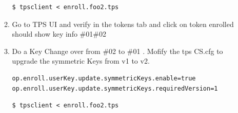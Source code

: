 \documentclass[12pt]{report}
\begin{document}
\begin{enumerate}[label*=\arabic*.]
\begin{enumerate}[label*=\arabic*.]
\begin{lstlisting}[style=bashInputStyle]
$ tpsclient < enroll.foo2.tps
                    \end{lstlisting}
                \item Go to TPS UI and verify in the tokens tab and click on token enrolled should show key info \#01\#02
                \item Do a Key Change over from \#02 to \#01 . Mofify the tps CS.cfg to upgrade the symmetric Keys from v1 to v2.
                    \begin{lstlisting}
op.enroll.userKey.update.symmetricKeys.enable=true
op.enroll.userKey.update.symmetricKeys.requiredVersion=1
                    \end{lstlisting}
                    \begin{lstlisting}[style=bashInputStyle]
$ tpsclient < enroll.foo2.tps
                    \end{lstlisting}
             \end{enumerate}
    \end{enumerate}                 

\end{document}
